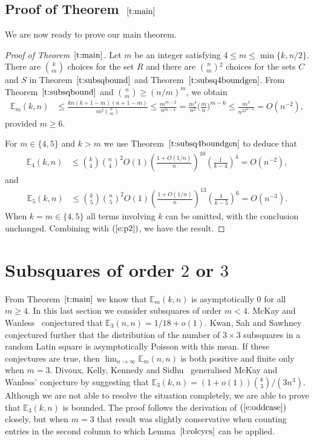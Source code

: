 \documentclass[12pt]{article}
\theoremstyle{definition}
\numberwithin{equation}{section}
\def\eref#1{$(\ref{#1})$}
\def\lref#1{Lemma~$\ref{#1}$}
\def\tref#1{Theorem~$\ref{#1}$}
\renewcommand{\geq}{\geqslant}
\renewcommand{\leq}{\leqslant}
\renewcommand{\ge}{\geqslant}
\renewcommand{\le}{\leqslant}
\newcommand{\E}{\mathbb{E}}
\begin{document}
	\subsection{Proof of \tref{t:main}}\label{ss:combine}
	
	We are now ready to prove our main theorem.
	
	\begin{proof}[Proof of \tref{t:main}]
		Let $m$ be an integer satisfying $4 \leq m \leq \min\{k, n/2\}$.
		There are $\binom{k}{m}{}$ choices for the set $R$ and there are
		$\binom{n}{m}{}^2$ choices for the sets $C$ and $S$ in
		\tref{t:subsqbound} and \tref{t:subsq4boundgen}. From
		\tref{t:subsqbound} and $\binom{n}{m}\geq (n/m)^m$, we obtain
		\begin{align}
			\E_m(k, n) &\leq \frac{kn(k+1-m)(n+1-m)}{m^2\binom{n}{m}}
			\leq\frac{m^{m-2}}{n^{m-4}}=\frac{m^4}{n^2}\Big(\frac mn\Big)^{m-6}\le\frac{m^4}{n^22^{m-6}}=O(n^{-2}), \label{e:p2}
		\end{align}
		provided $m\ge6$.
		
		For $m\in\{4,5\}$ and $k>m$ we use \tref{t:subsq4boundgen} to deduce that
		\begin{align*}
			\E_4(k,n) &\leq \binom{k}{4}\binom{n}{4}^2O(1)\left(\frac{1+O(1/n)}n\right)^{10}\left(\frac{1}{k-4}\right)^{4}=O(n^{-2}),
		\end{align*}
		and
		\begin{align*}
			\E_5(k,n) &\leq \binom{k}{5}\binom{n}{5}^2O(1)\left(\frac{1+O(1/n)}n\right)^{13}\left(\frac{1}{k-5}\right)^{6}
			= O(n^{-3}).
		\end{align*}
		When $k=m\in\{4,5\}$ all terms involving $k$ can be omitted, with the
		conclusion unchanged.  Combining with \eref{e:p2}, we have the
		result.
	\end{proof}
	
	\section{Subsquares of order $2$ or $3$}\label{s:subsq3}
	
	From \tref{t:main} we know that $\E_m(k,n)$ is asymptotically $0$ for
	all $m\ge4$. In this last section we consider subsquares of order $m<4$.
	McKay and Wanless~\cite{manysubsq} conjectured that
	$\E_3(n,n)=1/18+o(1)$. Kwan, Sah and Sawhney \cite{KSS} conjectured
	further that the distribution of the number of $3\times3$ subsquares
	in a random Latin square is asymptotically Poisson with this mean. If
	these conjectures are true, then $\lim_{n \to \infty} \E_m(n, n)$ is
	both positive and finite only when $m=3$.  Divoux, Kelly, Kennedy and
	Sidhu~\cite{subsqrandom} generalised McKay and Wanless' conjecture by
	suggesting that $\E_3(k, n) = (1+o(1))\binom{k}{3}/(3n^3)$.  Although
	we are not able to resolve the situation completely, we are able to
	prove that $\E_3(k, n)$ is bounded. The proof follows the derivation
	of \eref{e:oddcase} closely, but when $m=3$ that result was slightly
	conservative when counting entries in the second column to which
	\lref{l:colcycs} can be applied.
	
\end{document}
